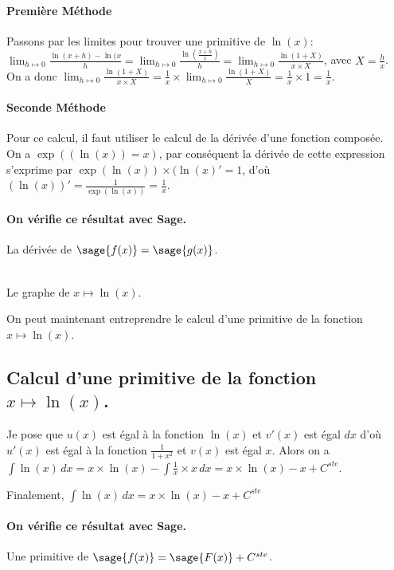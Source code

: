 \documentclass[a4paper,12pt]{report}
\begin{document}
\paragraph{Première Méthode}
Passons par les limites pour trouver une primitive de $\ln(x)$:\\
$ \lim_{h \mapsto 0} \frac{\ln(x+h) - \ln(x}{h} = \lim_{h \mapsto 0} \frac{\ln(\frac{x+h}{x})}{h}  = \lim_{h \mapsto 0} \frac{ \ln(1+X)}{x\times X}$, avec $X=\frac{h}{x}$.\\
On a donc 
$\lim_{h \mapsto 0} \frac{\ln(1+X)}{x\times X} = \frac{1}{x} \times \lim_{h \mapsto 0} \frac{\ln(1+X)}{X} = \frac{1}{x} \times 1 = \frac{1}{x}$.
\paragraph{Seconde Méthode}
Pour ce calcul, il faut utiliser le calcul de la dérivée d'une fonction composée. \\
On a $\exp((\ln(x))=x)$, par conséquent la dérivée de cette expression s'exprime par $ \exp(\ln(x)) \times (\ln(x)' = 1$, d'où $(\ln(x))' = \frac{1}{\exp(\ln(x))}  = \frac{1}{x} $.
\paragraph{On vérifie ce résultat avec Sage.}
La dérivée de $\sage{f(x)} = \sage{g(x)} $.
\begin{center}
 \\
Le graphe de $x \mapsto \ln(x) $.
\end{center}


On peut maintenant entreprendre le calcul d'une primitive de la  fonction  $x \mapsto \ln(x) $.







\subsection{Calcul d'une primitive de la fonction  $x \mapsto \ln(x) $.}
Je pose que $u(x)$  est égal à la fonction $\ln(x)$ et $v'(x)$ est égal $dx$  d'où $u'(x)$  est égal à la fonction $ \frac{1}{1+ x^2} $ et $v(x)$ est égal $x$.
Alors on a $\int \ln(x) \, dx = x \times \ln(x) -\int \frac{1}{x} \times x \, dx = x \times \ln(x) - x + C^{ste} $.

Finalement, $\int \ln(x) \, dx = x \times \ln(x) -x + C^{ste} $
\paragraph{On vérifie ce résultat avec Sage.}
Une primitive de $\sage{f(x)} = \sage{F(x)} + C^{ste} $.
\end{document}
